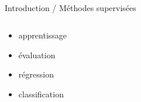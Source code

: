 \begin{frame}{\bititle\\Introduction / Méthodes supervisées}
\begin{columns}\begin{column}{.5\textwidth}

\begin{itemize}
\item<1-> apprentissage
\item<2-> évaluation
\item<3-> régression
\item<4-> classification
\end{itemize}

\end{column}\begin{column}{.5\textwidth}


\end{column}\end{columns}
\end{frame}
